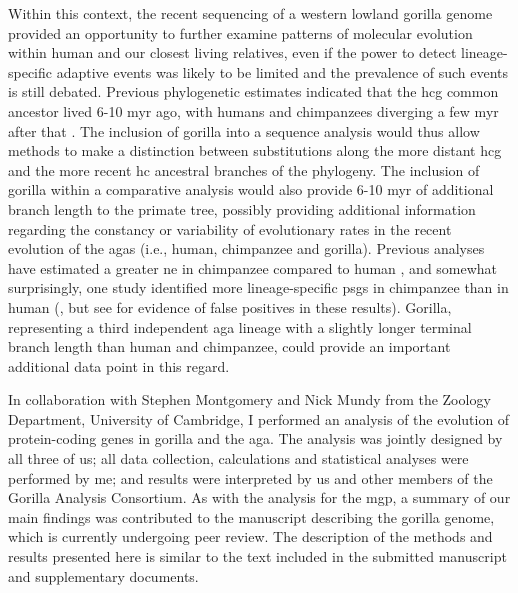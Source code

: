 Within this context, the recent sequencing of a western lowland
gorilla genome provided an opportunity to further examine patterns of
molecular evolution within human and our closest living relatives,
even if the power to detect lineage-specific adaptive events was
likely to be limited and the prevalence of such events is still
debated. Previous phylogenetic estimates indicated that the \ac{hcg}
common ancestor lived 6-10 \ac{myr} ago, with humans and chimpanzees
diverging a few \ac{myr} after that \citep{Bradley2008}. The inclusion
of gorilla into a sequence analysis would thus allow methods to make a
distinction between substitutions along the more distant \ac{hcg} and
the more recent \ac{hc} ancestral branches of the phylogeny. The
inclusion of gorilla within a comparative analysis would also provide
6-10 \ac{myr} of additional branch length to the primate tree,
possibly providing additional information regarding the constancy or
variability of evolutionary rates in the recent evolution of the
\acp{aga} (i.e., human, chimpanzee and gorilla). Previous analyses
have estimated a greater \ac{ne} in chimpanzee compared to human
\citep{Sequencing2005a,Siepel2009a}, and somewhat surprisingly, one
study identified more lineage-specific \acp{psg} in chimpanzee than in
human (\citet{Bakewell2007}, but see \citet{Mallick2009} for evidence
of false positives in these results). Gorilla, representing a third
independent \ac{aga} lineage with a slightly longer terminal branch
length than human and chimpanzee, could provide an important
additional data point in this regard.

In collaboration with Stephen Montgomery and Nick Mundy from the
Zoology Department, University of Cambridge, I performed an analysis
of the evolution of protein-coding genes in gorilla and the
\ac{aga}. The analysis was jointly designed by all three of us; all data
collection, calculations and statistical analyses were performed by
me; and results were interpreted by us and other members of the
Gorilla Analysis Consortium. As with the analysis for the \acl{mgp}, a
summary of our main findings was contributed to the manuscript
describing the gorilla genome, which is currently undergoing peer
review. The description of the methods and results presented here is
similar to the text included in the submitted manuscript and
supplementary documents.

